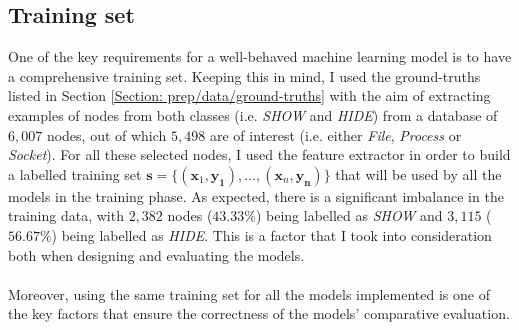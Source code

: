 	\subsection{Training set} \label{Section: impl/ml/training-set}
	One of the key requirements for a well-behaved machine learning model is to have a comprehensive training set. Keeping this in mind, I used the ground-truths listed in Section \ref{Section: prep/data/ground-truths} with the aim of extracting examples of nodes from both classes (i.e. \textit{SHOW} and \textit{HIDE}) from a database of $6,007$ nodes, out of which $5,498$ are of interest (i.e. either \textit{File}, \textit{Process} or \textit{Socket}). For all these selected nodes, I used the feature extractor in order to build a labelled training set $\mathbf{s}=\{ (\mathbf{x}_1, \mathbf{y_1}), \dots, (\mathbf{x}_n, \mathbf{y_n}) \}$ that will be used by all the models in the training phase. As expected, there is a significant imbalance in the training data, with $2,382$ nodes ($43.33\%$) being labelled as \textit{SHOW} and $3,115$ ($56.67\%$) being labelled as \textit{HIDE}. This is a factor that I took into consideration both when designing and evaluating the models.
	\\ \\
	Moreover, using the same training set for all the models implemented is one of the key factors that ensure the correctness of the models' comparative evaluation. 
	
